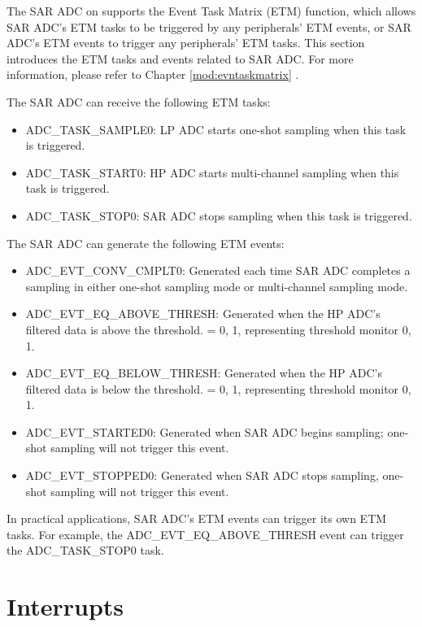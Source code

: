 \documentclass[main\_\_EN.tex]{subfiles}
\begin{document}
The SAR ADC on \chipname{} supports the Event Task Matrix (ETM) function, which allows SAR ADC's ETM tasks to be triggered by any peripherals' ETM events, or SAR ADC's ETM events to trigger any peripherals' ETM tasks. This section introduces the ETM tasks and events related to SAR ADC. For more information, please refer to Chapter \ref{mod:evntaskmatrix} .

The SAR ADC can receive the following ETM tasks:

\begin{itemize}
    \item ADC\_TASK\_SAMPLE0: LP ADC starts one-shot sampling when this task is triggered.
    \item ADC\_TASK\_START0: HP ADC starts multi-channel sampling when this task is triggered.
    \item ADC\_TASK\_STOP0: SAR ADC stops sampling when this task is triggered.
\end{itemize}

The SAR ADC can generate the following ETM events:

\begin{itemize}
    \item ADC\_EVT\_CONV\_CMPLT0: Generated each time SAR ADC completes a sampling in either one-shot sampling mode or multi-channel sampling mode.
    \item ADC\_EVT\_EQ\_ABOVE\_THRESH: Generated when the HP ADC's filtered data is above the threshold.  = 0, 1, representing threshold monitor 0, 1.
    \item ADC\_EVT\_EQ\_BELOW\_THRESH: Generated when the HP ADC's filtered data is below the threshold.  = 0, 1, representing threshold monitor 0, 1.
    \item ADC\_EVT\_STARTED0: Generated when SAR ADC begins sampling; one-shot sampling will not trigger this event.
    \item ADC\_EVT\_STOPPED0: Generated when SAR ADC stops sampling, one-shot sampling will not trigger this event.
\end{itemize}

In practical applications, SAR ADC's ETM events can trigger its own ETM tasks. For example, the ADC\_EVT\_EQ\_ABOVE\_THRESH event can trigger the ADC\_TASK\_STOP0 task.


\section{Interrupts}
\end{document}
